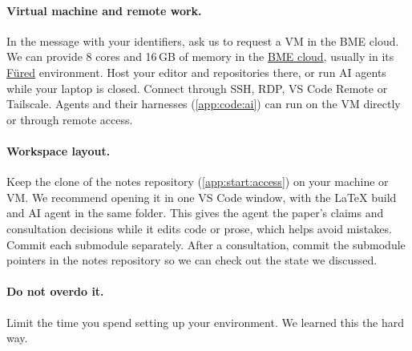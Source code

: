 \paragraph{Virtual machine and remote work.} In the message with your identifiers, ask us to request a VM in the BME cloud. We can provide 8 cores and 16\,GB of memory in the \href{https://cloud.bme.hu/}{BME cloud}, usually in its \href{https://fured.cloud.bme.hu/}{Füred} environment. Host your editor and repositories there, or run AI agents while your laptop is closed. Connect through SSH, RDP, VS Code Remote or Tailscale. Agents and their harnesses (\cref{app:code:ai}) can run on the VM directly or through remote access.

\paragraph{Workspace layout.} Keep the clone of the notes repository (\cref{app:start:access}) on your machine or VM. We recommend opening it in one VS Code window, with the \LaTeX{} build and AI agent in the same folder. This gives the agent the paper's claims and consultation decisions while it edits code or prose, which helps avoid mistakes. Commit each submodule separately. After a consultation, commit the submodule pointers in the notes repository so we can check out the state we discussed.

\paragraph{Do not overdo it.} Limit the time you spend setting up your environment. We learned this the hard way.
